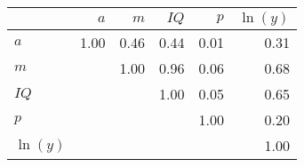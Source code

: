 \begin{tabular}{lrrrrr}
\hline
 & $a$  & $m$  & $IQ$  & $p$  & $\ln(y)$  \\
\hline
$a$ & 1.00  & 0.46  & 0.44  & 0.01  & 0.31  \\
$m$ &   & 1.00  & 0.96  & 0.06  & 0.68  \\
$IQ$ &   &   & 1.00  & 0.05  & 0.65  \\
$p$ &   &   &   & 1.00  & 0.20  \\
$\ln(y)$ &   &   &   &   & 1.00  \\
\hline
\end{tabular}%
